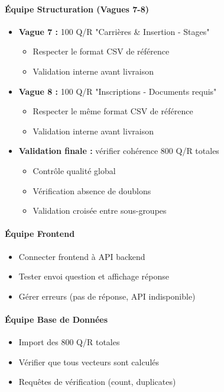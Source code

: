 \documentclass[11pt,a4paper]{article}
\begin{document}
\paragraph{Équipe Structuration (Vagues 7-8)}
\begin{itemize}
    \item[$\square$] \textbf{Vague 7 :} 100 Q/R "Carrières \& Insertion - Stages"
    \begin{itemize}
        \item Respecter le format CSV de référence
        \item Validation interne avant livraison
    \end{itemize}

    \item[$\square$] \textbf{Vague 8 :} 100 Q/R "Inscriptions - Documents requis"
    \begin{itemize}
        \item Respecter le même format CSV de référence
        \item Validation interne avant livraison
    \end{itemize}

    \item[$\square$] \textbf{Validation finale :} vérifier cohérence 800 Q/R totales
    \begin{itemize}
        \item Contrôle qualité global
        \item Vérification absence de doublons
        \item Validation croisée entre sous-groupes
    \end{itemize}
\end{itemize}


\paragraph{Équipe Frontend}
\begin{itemize}
    \item[$\square$] Connecter frontend à API backend
    \item[$\square$] Tester envoi question et affichage réponse
    \item[$\square$] Gérer erreurs (pas de réponse, API indisponible)
\end{itemize}

\paragraph{Équipe Base de Données}
\begin{itemize}
    \item[$\square$] Import des 800 Q/R totales
    \item[$\square$] Vérifier que tous vecteurs sont calculés
    \item[$\square$] Requêtes de vérification (count, duplicates)
\end{itemize}
\end{document}
